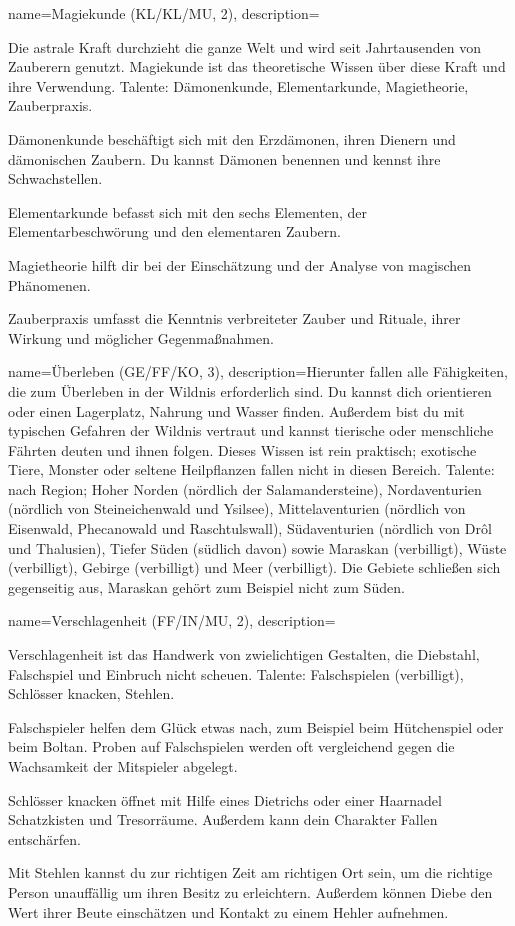 {
    name={Magiekunde (KL/KL/MU, 2)},
    description={Die astrale Kraft durchzieht die ganze Welt und wird seit Jahrtausenden von Zauberern genutzt. Magiekunde ist das theoretische Wissen über diese Kraft und ihre Verwendung. Talente: Dämonenkunde, Elementarkunde, Magietheorie, Zauberpraxis.
\begin{description}
\item Dämonenkunde beschäftigt sich mit den Erzdämonen, ihren Dienern und dämonischen Zaubern. Du kannst Dämonen benennen und kennst ihre Schwachstellen.
\item Elementarkunde befasst sich mit den sechs Elementen, der Elementarbeschwörung und den elementaren Zaubern.
\item Magietheorie hilft dir bei der Einschätzung und der Analyse von magischen Phänomenen.
\item Zauberpraxis umfasst die Kenntnis verbreiteter Zauber und Rituale, ihrer Wirkung und möglicher Gegenmaßnahmen.
\end{description}}}

{
    name={Überleben (GE/FF/KO, 3)},
    description={Hierunter fallen alle Fähigkeiten, die zum Überleben in der Wildnis erforderlich sind. Du kannst dich orientieren oder einen Lagerplatz, Nahrung und Wasser finden. Außerdem bist du mit typischen Gefahren der Wildnis vertraut und kannst tierische oder menschliche Fährten deuten und ihnen folgen. Dieses Wissen ist rein praktisch; exotische Tiere, Monster oder seltene Heilpflanzen fallen nicht in diesen Bereich. Talente: nach Region; Hoher Norden (nördlich der Salamandersteine), Nordaventurien (nördlich von Steineichenwald und Ysilsee), Mittelaventurien (nördlich von Eisenwald, Phecanowald und Raschtulswall), Südaventurien (nördlich von Drôl und Thalusien), Tiefer Süden (südlich davon) sowie Maraskan (verbilligt), Wüste (verbilligt), Gebirge (verbilligt) und Meer (verbilligt). Die Gebiete schließen sich gegenseitig aus, Maraskan gehört zum Beispiel nicht zum Süden.}}

{
    name={Verschlagenheit (FF/IN/MU, 2)},
    description={Verschlagenheit ist das Handwerk von zwielichtigen Gestalten, die Diebstahl, Falschspiel und Einbruch nicht scheuen. Talente: Falschspielen (verbilligt), Schlösser knacken, Stehlen.
\begin{description}
\item Falschspieler helfen dem Glück etwas nach, zum Beispiel beim Hütchenspiel oder beim Boltan. Proben auf Falschspielen werden oft vergleichend gegen die Wachsamkeit der Mitspieler abgelegt.
\item Schlösser knacken öffnet mit Hilfe eines Dietrichs oder einer Haarnadel Schatzkisten und Tresorräume. Außerdem kann dein Charakter Fallen entschärfen.
\item Mit Stehlen kannst du zur richtigen Zeit am richtigen Ort sein, um die richtige Person unauffällig um ihren Besitz zu erleichtern. Außerdem können Diebe den Wert ihrer Beute einschätzen und Kontakt zu einem Hehler aufnehmen.
\end{description}}}

